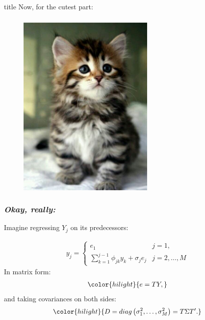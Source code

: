 \documentclass[12pt]{beamer}
\newcommand{\newmaththought}[1]{{ \color{hilight} {#1}}}
\begin{document}
\begin{frame}
\frametitle{}

\vfill
  \begin{beamercolorbox}[center]{title}
\Large Now, for the cutest part:
  \end{beamercolorbox}
  \vfill

\end{frame}




\begin{frame}
\frametitle{}
\begin{figure}
\graphicspath{{img/}}
  \includegraphics[height=9cm]{cutest-kitten-ever}
\end{figure}

\end{frame}

\begin{frame}
\frametitle{\emph{Okay, really:}}

Imagine regressing $Y_j$ on its predecessors:

\begin{align} \label{eq:ARmodel}
y_{j}  = \left\{  \begin{array}{ll} 
		e_1 &j=1, \\
  \sum \limits_{k=1}^{j-1} \phi_{jk} y_{k} + \sigma_{j}e_{j} &  j=2,\dots,M
\end{array}\right.
\end{align}
\noindent
In matrix form:
\begin{align}
\newmaththought{ e = TY,}
\end{align}
\noindent
 and taking covariances on both sides:
\begin{equation}
\newmaththought{ D = diag\left( \sigma_1^2,\dots, \sigma_M^2 \right) = T \Sigma T^\prime.}
\end{equation}
\end{frame}
\end{document}
